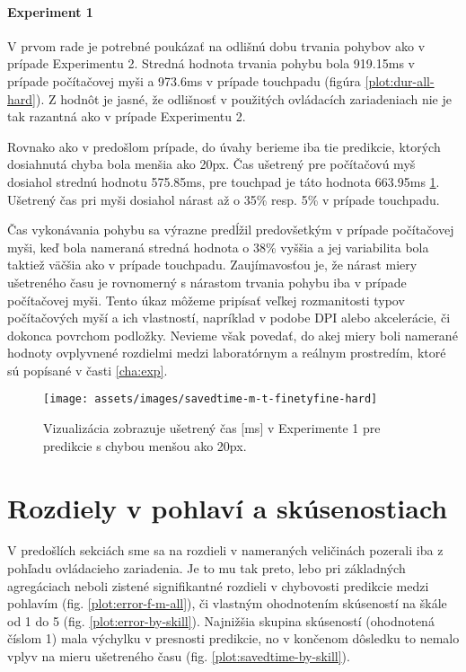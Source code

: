 \paragraph{Experiment 1}
V prvom rade je potrebné poukázať na odlišnú dobu trvania pohybov ako v prípade Experimentu 2. Stredná hodnota trvania pohybu bola 919.15ms v prípade počítačovej myši a 973.6ms v prípade touchpadu (figúra \ref{plot:dur-all-hard}). Z hodnôt je jasné, že odlišnosť v použitých ovládacích zariadeniach nie je tak razantná ako v prípade Experimentu 2. 

Rovnako ako v predošlom prípade, do úvahy berieme iba tie predikcie, ktorých dosiahnutá chyba bola menšia ako 20px. Čas ušetrený pre počítačovú myš dosiahol strednú hodnotu 575.85ms, pre touchpad je táto hodnota 663.95ms \ref{plot:savedtime-finetyfine-hard}. Ušetrený čas pri myši dosiahol nárast až o 35\% resp. 5\% v prípade touchpadu.

Čas vykonávania pohybu sa výrazne predĺžil predovšetkým v prípade počítačovej myši, keď bola nameraná stredná hodnota o 38\% vyššia a jej variabilita bola taktiež väčšia ako v prípade touchpadu. Zaujímavosťou je, že nárast miery ušetreného času je rovnomerný s nárastom trvania pohybu iba v prípade počítačovej myši. Tento úkaz môžeme pripísať veľkej rozmanitosti typov počítačových myší a ich vlastností, napríklad v podobe DPI alebo akcelerácie, či dokonca povrchom podložky. Nevieme však povedať, do akej miery boli namerané hodnoty ovplyvnené rozdielmi medzi laboratórnym a reálnym prostredím, ktoré sú popísané v časti \ref{cha:exp}.

\begin{figure}[h]
\centering
\texttt{[image: assets/images/savedtime-m-t-finetyfine-hard]}
\caption{Vizualizácia zobrazuje ušetrený čas [ms] v Experimente 1 pre predikcie s chybou menšou ako 20px. \label{plot:savedtime-finetyfine-hard}}
\end{figure}

\section{Rozdiely v pohlaví a skúsenostiach}
V predošlích sekciách sme sa na rozdieli v nameraných veličinách pozerali iba z pohľadu ovládacieho zariadenia. Je to mu tak preto, lebo pri základných agregáciach neboli zistené signifikantné rozdieli v chybovosti predikcie medzi pohlavím (fig. \ref{plot:error-f-m-all}), či vlastným ohodnotením skúseností na škále od 1 do 5 (fig. \ref{plot:error-by-skill}). Najnižšia skupina skúseností (ohodnotená číslom 1) mala výchylku v presnosti predikcie, no v končenom dôsledku to nemalo vplyv na mieru ušetreného času (fig. \ref{plot:savedtime-by-skill}).

